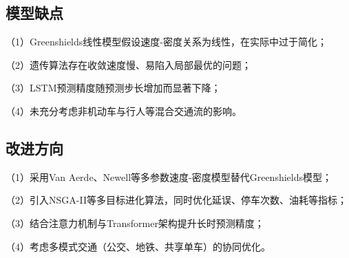 \subsection{模型缺点}

（1）Greenshields线性模型假设速度-密度关系为线性，在实际中过于简化；

（2）遗传算法存在收敛速度慢、易陷入局部最优的问题；

（3）LSTM预测精度随预测步长增加而显著下降；

（4）未充分考虑非机动车与行人等混合交通流的影响。

\subsection{改进方向}

（1）采用Van Aerde、Newell等多参数速度-密度模型替代Greenshields模型；

（2）引入NSGA-II等多目标进化算法，同时优化延误、停车次数、油耗等指标；

（3）结合注意力机制与Transformer架构提升长时预测精度；

（4）考虑多模式交通（公交、地铁、共享单车）的协同优化。

\nocite{*}


